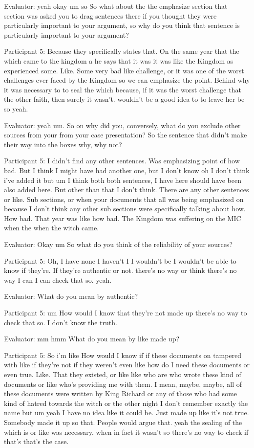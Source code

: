 \documentclass{l4proj}
\begin{document}
\begin{appendices}
Evaluator: yeah okay um so So what about the the emphasize section that section was asked you to drag sentences there if you thought they were particularly important to your argument, so why do you think that sentence is particularly important to your argument?

Participant 5: Because they specifically states that. On the same year that the which came to the kingdom a he says that it was it was like the Kingdom as experienced some. Like. Some very bad like challenge, or it was one of the worst challenges ever faced by the Kingdom so we can emphasize the point. Behind why it was necessary to to seal the which because, if it was the worst challenge that the other faith, then surely it wasn't. wouldn't be a good idea to to leave her be so yeah.
 
 

Evaluator: yeah um. So on why did you, conversely, what do you exclude other sources from your from your case presentation? So the sentence that didn't make their way into the boxes why, why not?

Participant 5: I didn't find any other sentences. Was emphasizing point of how bad. But I think I might have had another one, but I don't know oh I don't think i've added it but um I think both both sentences, I have here should have been also added here. But other than that I don't think. There are any other sentences or like. Sub sections, or when your documents that all was being emphasized on because I don't think any other sub sections were specifically talking about how. How bad. That year was like how bad. The Kingdom was suffering on the MIC when the when the witch came.

Evaluator: Okay um So what do you think of the reliability of your sources?

Participant 5: Oh, I have none I haven't I I wouldn't be I wouldn't be able to know if they're. If they're authentic or not. there's no way or think there's no way I can I can check that so. yeah.

Evaluator: What do you mean by authentic?

Participant 5: um How would I know that they're not made up there's no way to check that so. I don't know the truth.

Evaluator: mm hmm What do you mean by like made up?

Participant 5: So i'm like How would I know if if these documents on tampered with like if they're not if they weren't even like how do I need these documents or even true. Like.
That they existed, or like like who are who wrote these kind of documents or like who's providing me with them. I mean, maybe, maybe, all of these documents were written by King Richard or any of those who had some kind of hatred towards the witch or the other night I don't remember exactly the name but um yeah I have no idea like it could be. Just made up like it's not true. Somebody made it up so that. People would argue that. yeah the sealing of the which is or like was necessary. when in fact it wasn't so there's no way to check if that's that's the case.


\end{appendices}
\end{document}
